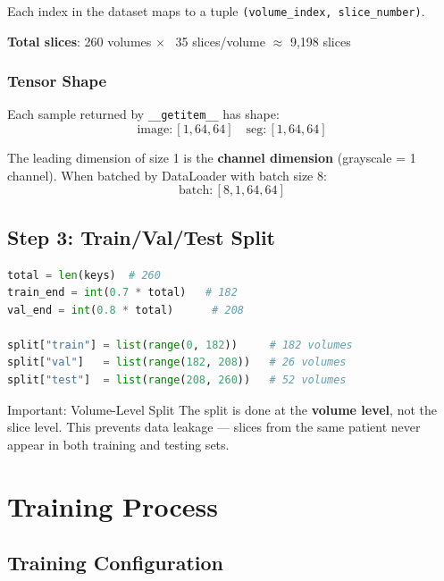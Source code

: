 \documentclass[12pt,a4paper]{report}
\begin{document}
Each index in the dataset maps to a tuple \texttt{(volume\_index, slice\_number)}.

\textbf{Total slices}: 260 volumes $\times$ ~35 slices/volume $\approx$ 9,198 slices

\subsection{Tensor Shape}

Each sample returned by \texttt{\_\_getitem\_\_} has shape:
$$\text{image}: [1, 64, 64] \quad \text{seg}: [1, 64, 64]$$

The leading dimension of size 1 is the \textbf{channel dimension} (grayscale = 1 channel). When batched by DataLoader with batch size 8:
$$\text{batch}: [8, 1, 64, 64]$$

\section{Step 3: Train/Val/Test Split}

\begin{lstlisting}[language=Python, caption=Data split (70/10/20)]
total = len(keys)  # 260
train_end = int(0.7 * total)   # 182
val_end = int(0.8 * total)      # 208

split["train"] = list(range(0, 182))     # 182 volumes
split["val"]   = list(range(182, 208))   # 26 volumes  
split["test"]  = list(range(208, 260))   # 52 volumes
\end{lstlisting}

\begin{warningbox}{Important: Volume-Level Split}
The split is done at the \textbf{volume level}, not the slice level. This prevents data leakage --- slices from the same patient never appear in both training and testing sets.
\end{warningbox}


\chapter{Training Process}

\section{Training Configuration}
\end{document}
